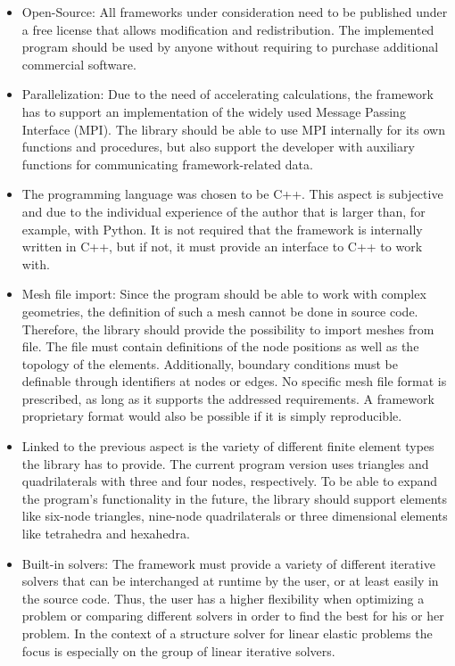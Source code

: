  \begin{itemize}
  \item Open-Source: All frameworks under consideration need to be published under a free license that allows modification and redistribution. The implemented program should be used by anyone without requiring to purchase additional commercial software.
  
  \item Parallelization: Due to the need of accelerating calculations, the framework has to support an implementation of the widely used Message Passing Interface (MPI). The library should be able to use MPI internally for its own functions and procedures, but also support the developer with auxiliary functions for communicating framework-related data.
 
  \item The programming language was chosen to be C++. This aspect is subjective and due to the individual experience of the author that is larger than, for example, with Python. It is not required that the framework is internally written in C++, but if not, it must provide an interface to C++ to work with.
 
  \item Mesh file import: Since the program should be able to work with complex geometries, the definition of such a mesh cannot be done in source code. Therefore, the library should provide the possibility to import meshes from file. The file must contain definitions of the node positions as well as the topology of the elements. Additionally, boundary conditions must be definable through identifiers at nodes or edges. No specific mesh file format is prescribed, as long as it supports the addressed requirements. A framework proprietary format would also be possible if it is simply reproducible.
  
  \item Linked to the previous aspect is the variety of different finite element types the library has to provide. The current program version uses triangles and quadrilaterals with three and four nodes, respectively. To be able to expand the program's functionality in the future, the library should support elements like six-node triangles, nine-node quadrilaterals or three dimensional elements like tetrahedra and hexahedra.
  
  \item Built-in solvers: The framework must provide a variety of different iterative solvers that can be interchanged at runtime by the user, or at least easily in the source code. Thus, the user has a higher flexibility when optimizing a problem or comparing different solvers in order to find the best for his or her problem. In the context of a structure solver for linear elastic problems the focus is especially on the group of linear iterative solvers.
 

\end{itemize}
